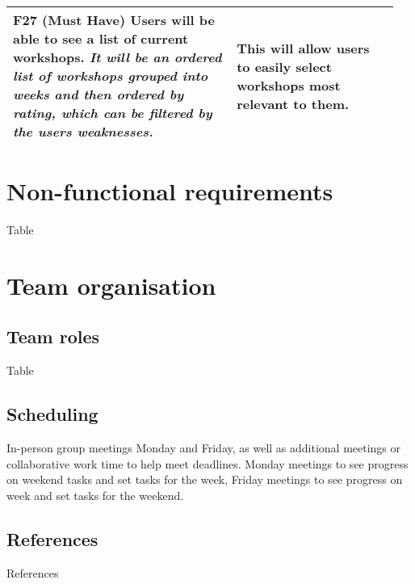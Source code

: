 \documentclass[10pt]{article}
\begin{document}
\begin{longtable}{|p{0.55\linewidth}|p{0.4\linewidth}|}
    \textbf{F27 (Must Have) }
    Users will be able to see a list of current workshops.
    \textit{It will be an ordered list of workshops grouped into weeks and then
    ordered by rating, which can be filtered by the users weaknesses.}
    &
    This will allow users to easily select workshops most relevant to them.
    \\ \hline


\end{longtable}


\vspace{-4mm}\section{Non-functional requirements}\vspace{-2mm}
Table

\vspace{-4mm}\section{Team organisation}\vspace{-2mm}
\subsection{Team roles}\vspace{-2mm}
Table

\vspace{-4mm}\subsection{Scheduling}\vspace{-2mm}
In-person group meetings Monday and Friday, as well as additional meetings or
collaborative work time to help meet deadlines. Monday meetings to see progress
on weekend tasks and set tasks for the week, Friday meetings to see progress on
week and set tasks for the weekend.

\vspace{-4mm}\subsection{References}\vspace{-2mm}
References
\end{document}
